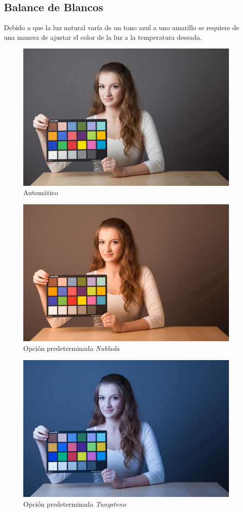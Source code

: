 \documentclass{article}
\begin{document}
\subsection{Balance de Blancos}

Debido a que la luz natural varía de un tono azul a uno amarillo se requiere de una manera de ajustar el color de la luz a la temperatura deseada.

\begin{figure}[H]
	\centering
	\includegraphics[width=0.65\linewidth]{Figuras/WB_1}
	\caption{Automático}
	\label{fig:wb1}
\end{figure}

\begin{figure}[H]
	\centering
	\includegraphics[width=0.65\linewidth]{Figuras/WB_2}
	\caption{Opción predeterminada \textit{Nublada}}
	\label{fig:wb2}
\end{figure}

\begin{figure}[H]
	\centering
	\includegraphics[width=0.65\linewidth]{Figuras/WB_3}
	\caption{Opción predeterminada \textit{Tungsteno}}
	\label{fig:wb3}
\end{figure}
\end{document}
